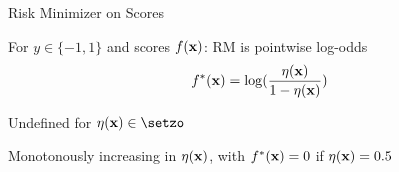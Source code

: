 \documentclass[11pt,compress,t,notes=noshow, xcolor=table]{beamer}
\begin{document}
\begin{framei}[sep=S]{Risk Minimizer on Scores}

\item For $y \in \{-1, 1\}$ and scores $f(\mathbf{x})$: RM is pointwise log-odds
$$f^{\ast}(\mathbf{x}) =  \log (\frac{\eta(\mathbf{x}) }{1-\eta(\mathbf{x}) })$$
\item Undefined for $\eta(\xv) \in \setzo$
\item Monotonously increasing in $\eta(\mathbf{x})$, with  $f^{\ast}(\mathbf{x}) = 0$ if $\eta(\mathbf{x})=0.5$

\vfill






\end{framei}
\end{document}
